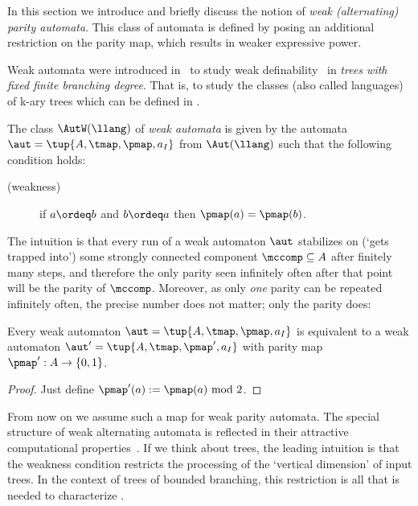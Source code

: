 In this section we introduce and briefly discuss the notion of \emph{weak (alternating) parity automata}.
This class of automata is defined by posing an additional restriction on the parity map, which results in weaker expressive power.

Weak automata were introduced in~\cite{DBLP:journals/tcs/MullerSS92} to study weak definability~\cite{Rabin1970} in \emph{trees with fixed finite branching degree}. That is, to study the classes (also called languages) of k-ary trees which can be defined in \wmso.

\begin{definition}\label{def:weak}
The class $\AutW(\llang)$ of \emph{weak automata} is given by the automata
$\aut = \tup{A,\tmap,\pmap,a_I}$ from $\Aut(\llang)$ such that 
the following condition holds:
\begin{description}
\item[(weakness)] if $a \ordeq b$ and $b \ordeq a$ then $\pmap(a) = \pmap(b)$.
\end{description}
\end{definition}

The intuition is that every run of a weak automaton $\aut$ stabilizes on (`gets trapped into') some strongly connected component $\mccomp \subseteq A$ after finitely many steps, and therefore the only parity seen infinitely often after that point will be the parity of $\mccomp$. Moreover, as only \emph{one} parity can be repeated infinitely often, the precise number does not matter; only the parity does:

\begin{fact}\label{fact:parity01}
Every weak automaton $\aut=\tup{A,\tmap,\pmap,a_I}$ is equivalent to a weak automaton
$\aut'=\tup{A,\tmap,\pmap',a_I}$ with parity map $\pmap': A \to \{0,1\}$. 
\end{fact}
\begin{proof}
	Just define $\pmap'(a) := \pmap(a) \textup{ mod } 2$.
\end{proof}

From now on we assume such a map for weak parity automata.
%
The special structure of weak alternating automata is reflected in their attractive computational properties~\cite{Kupferman2001,Kupferman2000}. If we think about trees, the leading intuition is that the weakness condition restricts the processing of the `vertical dimension' of input trees. In the context of trees of bounded branching, this restriction is all that is needed to characterize \wmso.


